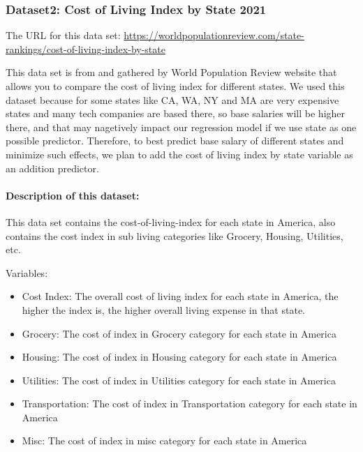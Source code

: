 \documentclass[
]{article}
\providecommand{\tightlist}{%
  \setlength{\itemsep}{0pt}\setlength{\parskip}{0pt}}
\begin{document}
\hypertarget{dataset2-cost-of-living-index-by-state-2021}{%
\subsubsection{Dataset2: Cost of Living Index by State
2021}\label{dataset2-cost-of-living-index-by-state-2021}}

The URL for this data set:
\url{https://worldpopulationreview.com/state-rankings/cost-of-living-index-by-state}

This data set is from and gathered by World Population Review website
that allows you to compare the cost of living index for different
states. We used this dataset because for some states like CA, WA, NY and
MA are very expensive states and many tech companies are based there, so
base salaries will be higher there, and that may nagetively impact our
regression model if we use state as one possible predictor. Therefore,
to best predict base salary of different states and minimize such
effects, we plan to add the cost of living index by state variable as an
addition predictor.

\hypertarget{description-of-this-dataset-1}{%
\paragraph{Description of this
dataset:}\label{description-of-this-dataset-1}}

This data set contains the cost-of-living-index for each state in
America, also contains the cost index in sub living categories like
Grocery, Housing, Utilities, etc.

Variables:

\begin{itemize}
\tightlist
\item
  Cost Index: The overall cost of living index for each state in
  America, the higher the index is, the higher overall living expense in
  that state.
\item
  Grocery: The cost of index in Grocery category for each state in
  America
\item
  Housing: The cost of index in Housing category for each state in
  America
\item
  Utilities: The cost of index in Utilities category for each state in
  America
\item
  Transportation: The cost of index in Transportation category for each
  state in America
\item
  Misc: The cost of index in misc category for each state in America
\end{itemize}
\end{document}

